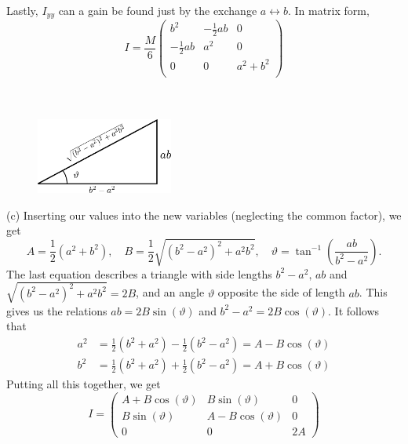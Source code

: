 \documentclass{article}
\begin{document}
        Lastly, $I_{yy}$ can a gain be found just by the exchange $a \leftrightarrow b$. In matrix form,
        \begin{equation*}
            I = \frac{M}{6}
            \begin{pmatrix*}
                b^2 & -\frac{1}{2} ab & 0 \\
                -\frac{1}{2} ab & a^2 & 0 \\
                0 & 0 & a^2 + b^2 \\
            \end{pmatrix*}
        \end{equation*}
        \\ \\
        \begin{figure}
            \includegraphics[width=0.4\textwidth]{figures/exercise_1_triangle2.pdf}
        \end{figure}
        (c) Inserting our values into the new variables (neglecting the common factor), we get
        \begin{equation*}
            A = \frac{1}{2}(a^2 + b^2), \quad B = \frac{1}{2}\sqrt{(b^2 - a^2)^2 +a^2b^2}, \quad \vartheta = \tan^{-1}\left( \frac{ab}{b^2 - a^2} \right).
        \end{equation*} 
        \newpage %
        The last equation describes a triangle with side lengths $b^2 - a^2, \, ab$ and $\sqrt{(b^2 - a^2)^2 +a^2b^2} = 2B$, and an angle $\vartheta$ opposite the side of length $ab$. This gives us the relations $ab=2 B \sin(\vartheta)$ and $b^2 - a^2 = 2B \cos(\vartheta)$. It follows that
        \begin{align*}
            a^2 &= \frac{1}{2}(b^2 + a^2)  - \frac{1}{2}(b^2 - a^2) = A - B \cos(\vartheta) \\
        b^2 &= \frac{1}{2}(b^2 + a^2)  + \frac{1}{2}(b^2 - a^2) = A + B \cos(\vartheta)
        \end{align*}
        Putting all this together, we get 
        \begin{equation*}
            I =
            \begin{pmatrix*}
                A + B\cos(\vartheta) & B \sin(\vartheta) & 0 \\
                B \sin(\vartheta) & A - B\cos(\vartheta) & 0 \\
                0 & 0 & 2A
            \end{pmatrix*}
        \end{equation*}
\end{document}
